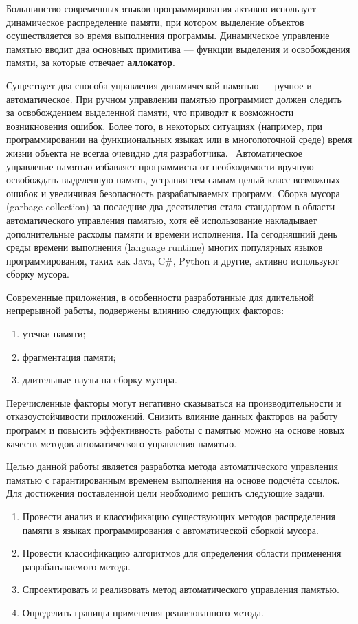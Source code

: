 Большинство современных языков программирования активно использует динамическое распределение памяти, при котором выделение объектов осуществляется во время выполнения программы. Динамическое управление памятью вводит два основных примитива --- функции выделения и освобождения памяти, за которые отвечает \textbf{аллокатор}. 

Существует два способа управления динамической памятью --- ручное и автоматическое. При ручном управлении памятью программист должен следить за освобождением выделенной памяти, что приводит к возможности возникновения ошибок. Более того, в некоторых ситуациях (например, при программировании на функциональных языках или в многопоточной среде) время жизни объекта не всегда очевидно для разработчика.~\cite{elixir} Автоматическое управление памятью избавляет программиста от необходимости вручную освобождать выделенную память, устраняя тем самым целый класс возможных ошибок и увеличивая безопасность разрабатываемых программ. Сборка мусора (garbage collection) за последние два десятилетия стала стандартом в области автоматического управления памятью, хотя её использование накладывает дополнительные расходы памяти и времени исполнения. На сегодняшний день среды времени выполнения (language runtime) многих популярных языков программирования, таких как Java, C\#, Python и другие, активно используют сборку мусора. 

Современные приложения, в особенности разработанные для длительной непрерывной работы, подвержены влиянию следующих факторов: 
\begin{enumerate}[label*=\arabic*)]
	\item утечки памяти;
	\item фрагментация памяти;
	\item длительные паузы на сборку мусора.
\end{enumerate}
Перечисленные факторы могут негативно сказываться на производительности и отказоустойчивости приложений. Снизить влияние данных факторов на работу программ и повысить эффективность работы с памятью можно на основе новых качеств методов автоматического управления памятью.

Целью данной работы является разработка метода автоматического управления памятью с гарантированным временем выполнения на основе подсчёта ссылок. Для достижения поставленной цели необходимо решить следующие задачи.

\begin{enumerate}[label*=\arabic*.]
	\item Провести анализ и классификацию существующих методов распределения памяти в языках программирования с автоматической сборкой мусора.
	\item Провести классификацию алгоритмов для определения области применения разрабатываемого метода.
	\item Спроектировать и реализовать метод автоматического управления памятью.
	\item Определить границы применения реализованного метода. 
\end{enumerate}
